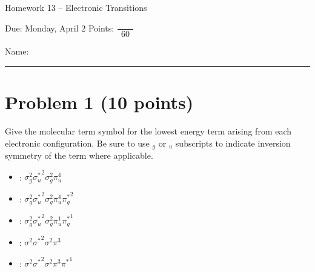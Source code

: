 \documentclass[10pt, letterpaper]{memoir}
\begin{document}
\begin{center}
	{\large Homework 13 -- Electronic Transitions}
	
	Due: Monday, April 2 \hspace{3em} Points: ${\dfrac{~}{~~60~~}}$
\end{center}

Name: \rule[-.1mm]{15em}{0.1pt}	
	
	\section*{Problem 1 (10 points)}
	Give the molecular term symbol for the lowest energy term arising from each electronic configuration. Be sure to use $_g$ or $_u$ subscripts to indicate inversion symmetry of the term where applicable.
	
	\noindent
	\begin{itemize}
		\item {}: $\sigma_g^2{\sigma_u^*}^2\sigma_g^2\pi_u^4$ 
		
		\vspace{8em}
		\item {}: $\sigma_g^2{\sigma_u^*}^2\sigma_g^2\pi_u^4{\pi_g^*}^2$ 
		
		\vspace{8em}
		\item {}: $\sigma_g^2{\sigma_u^*}^2\sigma_g^2\pi_u^1{\pi_g^*}^1$ 
		
		\vspace{8em}
		\item {}: $\sigma^2{\sigma^*}^2\sigma^2\pi^3$
		
		\vspace{8em}
		\item {}:  $\sigma^2{\sigma^*}^2\sigma^2\pi^3{\pi^*}^1$
	\end{itemize}
	
	
	\newpage
\end{document}
